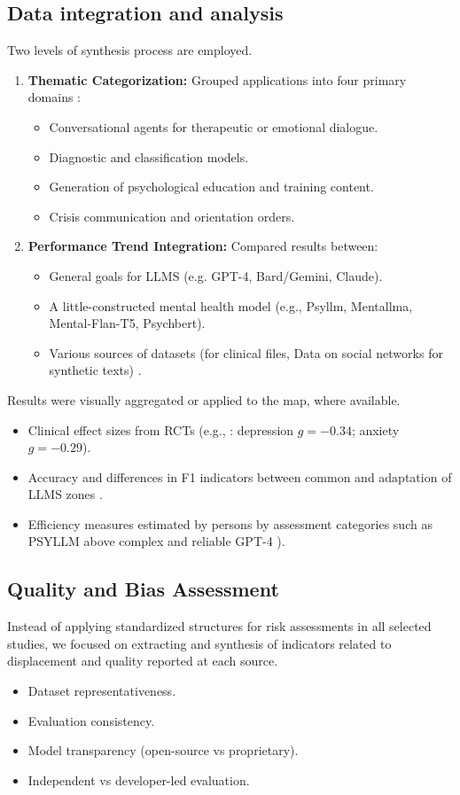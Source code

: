 \documentclass[journal]{IEEEtran}
\begin{document}
\subsection{Data integration and analysis}
Two levels of synthesis process are employed.
\begin{enumerate}
    \item \textbf{Thematic Categorization:} Grouped applications into four primary domains \cite{Hua2024b,JMIR2024}:
    \begin{itemize}
        \item Conversational agents for therapeutic or emotional dialogue.
        \item Diagnostic and classification models.
        \item Generation of psychological education and training content.
        \item Crisis communication and orientation orders.
    \end{itemize}
    \item \textbf{Performance Trend Integration:} Compared results between:
    \begin{itemize}
        \item General goals for LLMS (e.g. GPT-4, Bard/Gemini, Claude).
        \item A little-constructed mental health model (e.g., Psyllm, Mentallma, Mental-Flan-T5, Psychbert).
        \item Various sources of datasets (for clinical files, Data on social networks for synthetic texts) \cite{Hua2024}.
    \end{itemize}
\end{enumerate}

Results were visually aggregated or applied to the map, where available.
\begin{itemize}
    \item Clinical effect sizes from RCTs (e.g., \cite{Zhong2024}: depression $g = -0.34$; anxiety $g = -0.29$).
    \item Accuracy and differences in F1 indicators between common and adaptation of LLMS zones \cite{Hu2025}.
    \item Efficiency measures estimated by persons by assessment categories such as PSYLLM above complex and reliable GPT-4  \cite{Hu2025}).
\end{itemize}

\subsection{Quality and Bias Assessment}
Instead of applying standardized structures for risk assessments in all selected studies, we focused on extracting and synthesis of indicators related to displacement and quality reported at each source.
\begin{itemize}
    \item Dataset representativeness.
    \item Evaluation consistency.
    \item Model transparency (open-source vs proprietary).
    \item Independent vs developer-led evaluation.
\end{itemize}
\end{document}
